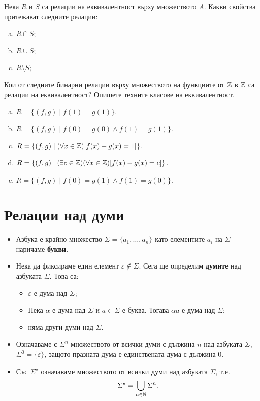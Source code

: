 \begin{problem}
  Нека $R$ и $S$ са релации на еквивалентност върху множеството $A$.
  Какви свойства притежават следните релации:
  \begin{enumerate}[a)]
  \item
    $R \cap S$;
  \item
    $R \cup S$;
  \item
    $R \setminus S$;
  \end{enumerate}
\end{problem}

\begin{problem}
  Кои от следните бинарни релации върху множеството на функциите от $\mathbb{Z}$ в $\mathbb{Z}$
  са релации на еквивалентност? Опишете техните класове на еквивалентност.
  \begin{enumerate}[a)]
  \item
    $R = \{(f,g)\mid f(1) = g(1)\}$.
  \item
    $R = \{(f,g)\mid f(0) = g(0)\wedge f(1) = g(1)\}$.
  \item
    $R =\{(f,g)\mid (\forall x\in\mathbb{Z})[f(x)-g(x) = 1]\}$.
  \item
    $R = \{(f,g)\mid (\exists c\in\mathbb{Z})(\forall x\in\mathbb{Z})[f(x)-g(x) = c]\}$.
  \item
    $R = \{(f,g)\mid f(0) = g(1)\wedge f(1) = g(0)\}$.
  \end{enumerate}
\end{problem}

\section{Релации над думи}

\begin{itemize}
\item
  Азбука е крайно множество $\Sigma = \{a_1,\dots,a_n\}$ като елементите $a_i$ на $\Sigma$ наричаме {\bf букви}.
\item
  Нека да фиксираме един елемент $\varepsilon \not\in \Sigma$.
  Сега ще определим {\bf думите} над азбуката $\Sigma$. Това са:
  \begin{itemize}
  \item
    $\varepsilon$ е дума над $\Sigma$;
  \item
    Нека $\alpha$ е дума над $\Sigma$ и $a \in \Sigma$ е буква.
    Тогава $\alpha a$ е дума над $\Sigma$;
  \item
    няма други думи над $\Sigma$.
  \end{itemize}
\item
  Означаваме с $\Sigma^n$ множеството от всички думи с дължина $n$ над азбуката $\Sigma$, $\Sigma^0 = \{\varepsilon\}$,
  защото празната дума е единствената дума с дължина $0$.
\item
  Със $\Sigma^\star$ означаваме множеството от всички думи над азбуката $\Sigma$, т.е.
  \marginpar{$0 \in \Nat$}
  \[\Sigma^\star = \bigcup_{n\in\mathbb{N}} \Sigma^{n}.\]
\end{itemize}

